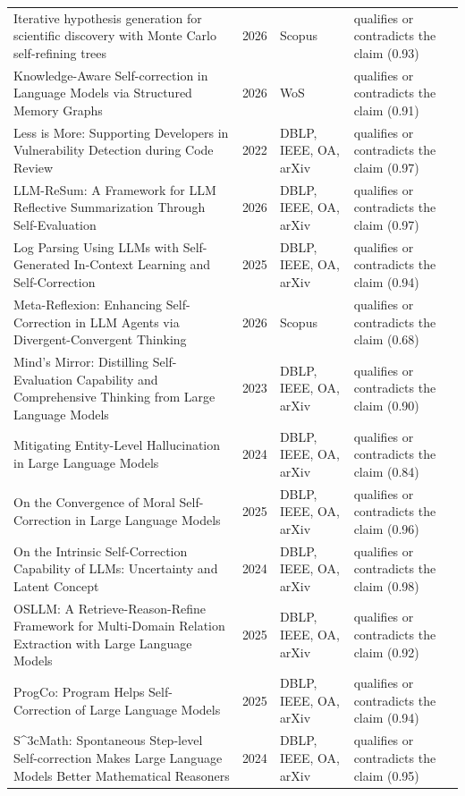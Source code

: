 \begin{longtable}{@{}%
  >{\raggedright\arraybackslash}p{}c%
  >{\raggedright\arraybackslash}p{}%
  >{\raggedright\arraybackslash}p{}@{}}
Iterative hypothesis generation for scientific discovery with Monte Carlo self-refining trees & 2026 & Scopus & qualifies or contradicts the claim (0.93) \\
Knowledge-Aware Self-correction in Language Models via Structured Memory Graphs & 2026 & WoS & qualifies or contradicts the claim (0.91) \\
Less is More: Supporting Developers in Vulnerability Detection during Code Review & 2022 & DBLP, IEEE, OA, arXiv & qualifies or contradicts the claim (0.97) \\
LLM-ReSum: A Framework for LLM Reflective Summarization Through Self-Evaluation & 2026 & DBLP, IEEE, OA, arXiv & qualifies or contradicts the claim (0.97) \\
Log Parsing Using LLMs with Self-Generated In-Context Learning and Self-Correction & 2025 & DBLP, IEEE, OA, arXiv & qualifies or contradicts the claim (0.94) \\
Meta-Reflexion: Enhancing Self-Correction in LLM Agents via Divergent-Convergent Thinking & 2026 & Scopus & qualifies or contradicts the claim (0.68) \\
Mind's Mirror: Distilling Self-Evaluation Capability and Comprehensive Thinking from Large Language Models & 2023 & DBLP, IEEE, OA, arXiv & qualifies or contradicts the claim (0.90) \\
Mitigating Entity-Level Hallucination in Large Language Models & 2024 & DBLP, IEEE, OA, arXiv & qualifies or contradicts the claim (0.84) \\
On the Convergence of Moral Self-Correction in Large Language Models & 2025 & DBLP, IEEE, OA, arXiv & qualifies or contradicts the claim (0.96) \\
On the Intrinsic Self-Correction Capability of LLMs: Uncertainty and Latent Concept & 2024 & DBLP, IEEE, OA, arXiv & qualifies or contradicts the claim (0.98) \\
OSLLM: A Retrieve-Reason-Refine Framework for Multi-Domain Relation Extraction with Large Language Models & 2025 & DBLP, IEEE, OA, arXiv & qualifies or contradicts the claim (0.92) \\
ProgCo: Program Helps Self-Correction of Large Language Models & 2025 & DBLP, IEEE, OA, arXiv & qualifies or contradicts the claim (0.94) \\
S\textasciicircum{}3cMath: Spontaneous Step-level Self-correction Makes Large Language Models Better Mathematical Reasoners & 2024 & DBLP, IEEE, OA, arXiv & qualifies or contradicts the claim (0.95) \\

\end{longtable}
